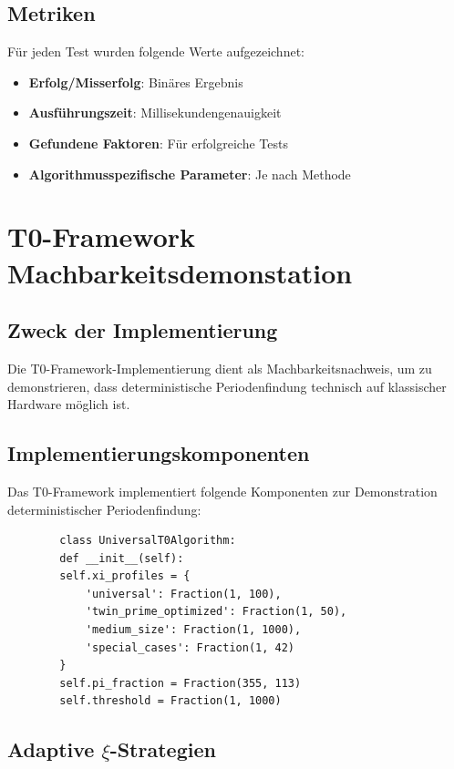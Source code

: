 	\subsection{Metriken}
	
	Für jeden Test wurden folgende Werte aufgezeichnet:
	\begin{itemize}
		\item \textbf{Erfolg/Misserfolg}: Binäres Ergebnis
		\item \textbf{Ausführungszeit}: Millisekundengenauigkeit
		\item \textbf{Gefundene Faktoren}: Für erfolgreiche Tests
		\item \textbf{Algorithmusspezifische Parameter}: Je nach Methode
	\end{itemize}
	
	\section{T0-Framework Machbarkeitsdemonstation}
	
	\subsection{Zweck der Implementierung}
	
	Die T0-Framework-Implementierung dient als Machbarkeitsnachweis, um zu demonstrieren, dass deterministische Periodenfindung technisch auf klassischer Hardware möglich ist.
	
	\subsection{Implementierungskomponenten}
	
	Das T0-Framework implementiert folgende Komponenten zur Demonstration deterministischer Periodenfindung:
	
	\begin{verbatim}
		class UniversalT0Algorithm:
		def __init__(self):
		self.xi_profiles = {
			'universal': Fraction(1, 100),
			'twin_prime_optimized': Fraction(1, 50),
			'medium_size': Fraction(1, 1000),
			'special_cases': Fraction(1, 42)
		}
		self.pi_fraction = Fraction(355, 113)
		self.threshold = Fraction(1, 1000)
	\end{verbatim}
	
	\subsection{Adaptive $\xi$-Strategien}
	
